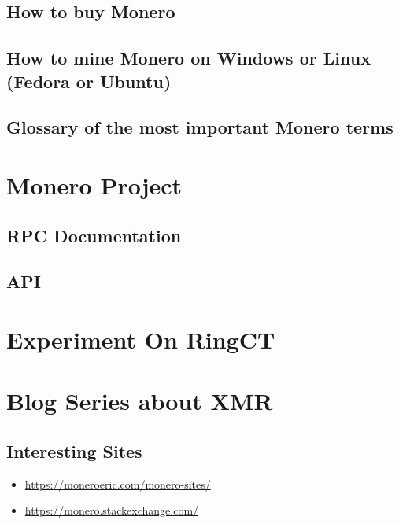 \documentclass[a4paper,10pt]{report}
\begin{document}
\section{How to buy Monero}
	

\section{How to mine Monero on Windows or Linux (Fedora or Ubuntu)}
	

\section{Glossary of the most important Monero terms}
	

\fi

\ifx\ProjectOff\undefined
\chapter{Monero Project}
\section{RPC Documentation}
	
\section{API}
	
\fi

\ifx\ExperimentOff
\chapter{Experiment On RingCT}
	
\fi

\ifx\BlogSeriesOff\undefined
\chapter{Blog Series about XMR}
\section{Interesting Sites}
	\begin{itemize}
		\item \url{https://moneroeric.com/monero-sites/}
		\item \url{https://monero.stackexchange.com/}
	\end{itemize}
\end{document}
